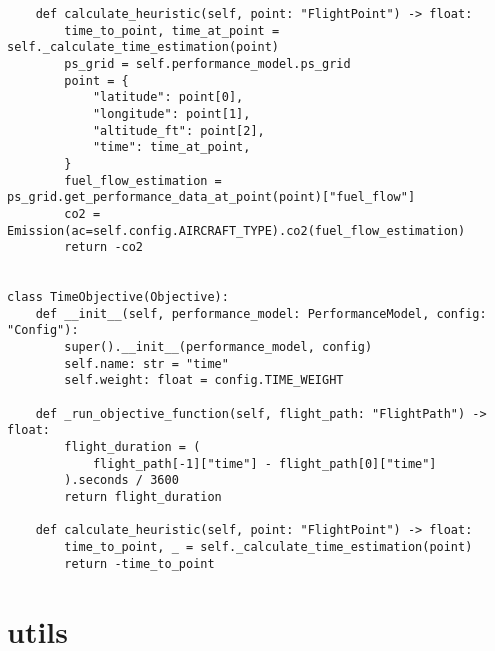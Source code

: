 \begin{verbatim}
    def calculate_heuristic(self, point: "FlightPoint") -> float:
        time_to_point, time_at_point = self._calculate_time_estimation(point)
        ps_grid = self.performance_model.ps_grid
        point = {
            "latitude": point[0],
            "longitude": point[1],
            "altitude_ft": point[2],
            "time": time_at_point,
        }
        fuel_flow_estimation = ps_grid.get_performance_data_at_point(point)["fuel_flow"]
        co2 = Emission(ac=self.config.AIRCRAFT_TYPE).co2(fuel_flow_estimation)
        return -co2


class TimeObjective(Objective):
    def __init__(self, performance_model: PerformanceModel, config: "Config"):
        super().__init__(performance_model, config)
        self.name: str = "time"
        self.weight: float = config.TIME_WEIGHT

    def _run_objective_function(self, flight_path: "FlightPath") -> float:
        flight_duration = (
            flight_path[-1]["time"] - flight_path[0]["time"]
        ).seconds / 3600
        return flight_duration

    def calculate_heuristic(self, point: "FlightPoint") -> float:
        time_to_point, _ = self._calculate_time_estimation(point)
        return -time_to_point

\end{verbatim}
\section{utils}
